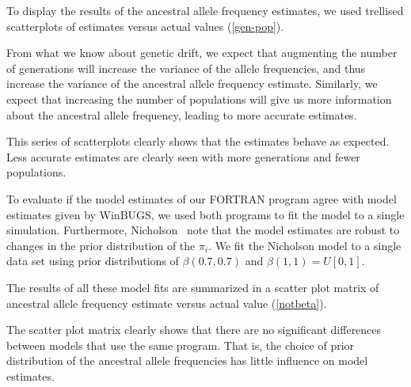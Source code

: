 \documentclass[a4paper,12pt]{article}
\begin{document}
To display the results of the ancestral allele frequency estimates, we
used trellised scatterplots of estimates versus actual values
(\autoref{gen-pop}).


From what we know about genetic drift, we expect that augmenting the
number of generations will increase the variance of the allele
frequencies, and thus increase the variance of the ancestral allele
frequency estimate. Similarly, we expect that increasing the number of
populations will give us more information about the ancestral allele
frequency, leading to more accurate estimates.

This series of scatterplots clearly shows that the estimates behave as
expected. Less accurate estimates are clearly seen with more
generations and fewer populations.

To evaluate if the model estimates of our FORTRAN program agree with
model estimates given by WinBUGS, we used both programs to fit the
model to a single simulation. Furthermore, Nicholson \etal\ note that
the model estimates are robust to changes in the prior distribution of
the $\pi_i$. We fit the Nicholson model to a single data set using
prior distributions of $\beta(0.7,0.7)$ and $\beta(1,1)=U[0,1]$.

The results of all these model fits are summarized in a scatter plot
matrix of ancestral allele frequency estimate versus actual value
(\autoref{notbeta}).


The scatter plot matrix clearly shows that there are no significant
differences between models that use the same program. That is, the
choice of prior distribution of the ancestral allele frequencies has
little influence on model estimates.

\end{document}

